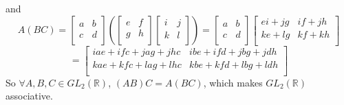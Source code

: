 \documentclass{article}
\newcommand{\R}{\mathbb{R}}
\begin{document}
    and 
    \[ A(BC) =
    \begin{bmatrix}
    a & b \\
    c & d \\
    \end{bmatrix}
    \left( \begin{bmatrix}
    e & f \\
    g & h \\
    \end{bmatrix}
    \begin{bmatrix}
    i & j \\
    k & l \\
    \end{bmatrix} \right)
    = \begin{bmatrix}
    a & b \\
    c & d \\
    \end{bmatrix}
    \begin{bmatrix}
    ei + jg & if + jh \\
    ke + lg & kf + kh \\
    \end{bmatrix} \]
    \[ = \begin{bmatrix}
    iae + ifc + jag + jhc & ibe + ifd + jbg + jdh \\
    kae + kfc + lag + lhc & kbe + kfd + lbg + ldh \\
    \end{bmatrix} \]
    So $\forall A, B, C \in GL_2(\R)$, $(AB)C = A(BC)$,
    which makes $GL_2(\R)$ associative.
\end{document}
